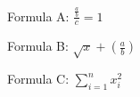 \documentclass{article}
\begin{document}
\noindent Formula A: $\displaystyle\frac{\frac{a}{b}}{c}=1$

\noindent Formula B: $\displaystyle\sqrt{x}+\left(\frac{a}{b}\right)$

\noindent Formula C: $\displaystyle\sum_{i=1}^{n}x_i^2$
\end{document}
